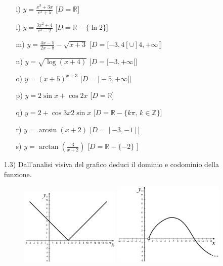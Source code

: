 \begin{itemize}
\begin{itemize}
\item[i)]$y=\frac{x^3+3x}{e^x+5}$\hfill   
  [$D=\mathbb{R}$]
  
\item[l)]$y=\frac{3x^2+4}{e^x-2}$   \hfill  
   [$D=\mathbb{R}-\{\ln2\}$]
  \item[m)] 
$y=\frac{4x-5}{2x-8}-\sqrt{x+3}$  \hfill  
[$D=[-3,4[\cup]4,+\infty[$]
  \item[n)]$y=\sqrt{\log(x+4)}$ 
   \hfill  [$D=[-3,+\infty[$]
  \item[o)]$y=(x+5)^{x+3}$  
   \hfill  [$D=]-5,+\infty[$]
  \item[p)] 
$y=2\sin{x}+\cos{2x}$   \hfill   
[$D=\mathbb{R}$]
  
\item[q)]$y={2+\cos{3x}}{2\sin{x}}$   \hfill  
   [$D=\mathbb{R}-\{k\pi,\,k\in \mathbb{Z}\}$]
  \item[r)] $y=\arcsin(x+2)$  
   \hfill  [$D=[-3, -1]$]
  
\item[s)]$y=\arctan(\frac{3}{x+2}) $  \hfill  
   [$D=\mathbb{R}-\{-2\}$ ]\\

  \end{itemize}
  \item[1.3)] Dall'analisi visiva del grafico deduci il 
dominio e codominio della funzione.
  \begin{figure}[htpb!]
  \centering
  
\includegraphics[width=0.45\textwidth]{img/funz_16.png}\quad  
  
\includegraphics[width=0.5\textwidth]{img/funz_17.png}  
  

\end{figure}
\end{itemize}
